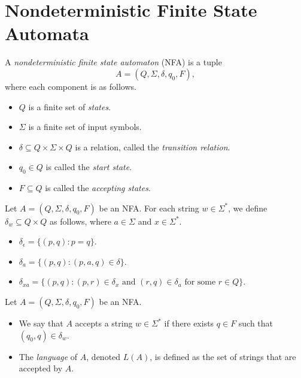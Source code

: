 \section{Nondeterministic Finite State Automata}
\begin{definition}
  \label{def:nfa}
  A \emph{nondeterministic finite state automaton} (NFA) is a tuple
  \begin{equation*}
    A = (Q, \Sigma, \delta, q_0, F),
  \end{equation*}
  where each component is as follows.
  \begin{itemize}
    \item $Q$ is a finite set of \emph{states}.
    \item $\Sigma$ is a finite set of input symbols.
    \item $\delta \subseteq Q \times \Sigma \times Q$ is a relation, called the
    \emph{transition relation}.
    \item $q_0 \in Q$ is called the \emph{start state}.
    \item $F \subseteq Q$ is called the \emph{accepting states}.
  \end{itemize}
\end{definition}

\begin{definition}
  Let $A = (Q, \Sigma, \delta, q_0, F)$ be an NFA.
  For each string $w \in \Sigma^*$, we define $\delta_w \subseteq Q \times Q$
  as follows, where $a \in \Sigma$ and $x \in \Sigma^*$.
  \begin{itemize}
    \item $\delta_\epsilon = \{(p, q): p = q\}$.
    \item $\delta_a = \{(p, q): (p, a, q) \in \delta\}$.
    \item $\delta_{xa} = \{(p, q): \text{$(p, r) \in \delta_x$ and
    $(r, q) \in \delta_a$ for some $r \in Q$}\}$.
  \end{itemize}
\end{definition}

\begin{definition}
  Let $A = (Q, \Sigma, \delta, q_0, F)$ be an NFA.
  \begin{itemize}
    \item We say that $A$ accepts a string $w \in \Sigma^*$ if there exists
    $q \in F$ such that $(q_0, q) \in \delta_w$.
    \item The \emph{language} of $A$, denoted $L(A)$, is defined as the set of
    strings that are accepted by $A$.
  \end{itemize}
\end{definition}

